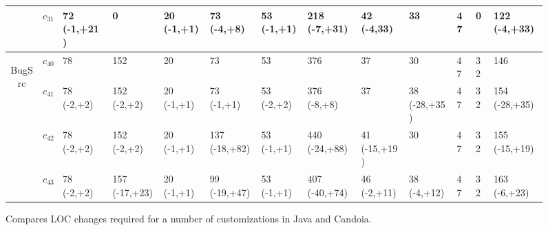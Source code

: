 \begin{figure}
\begin{adjustbox}{max width=\textwidth}
\begin{tabular}{|c|c|l|l|l|l|l|l|l|l|l|l|l|}
\cline{2-13} & $c_{31}$ & 72 (-1,+21) & 0 & 20 (-1,+1) & 73 (-4,+8) & 53 (-1,+1)
& 218 (-7,+31) & 42 (-4,33) & 33 & 47 & 0 & 122 (-4,+33)
\\

\hline

\multirow{4}{*}{\begin{sideways}BugSrc\end{sideways}} 
& $c_{40}$ & 78 & 152 & 20 & 73 & 53 & 376 & 37 & 30 & 47 & 32 & 146 \\ 

\cline{2-13} & $c_{41}$ & 78 (-2,+2) & 152 (-2,+2) & 20 (-1,+1) & 73 (-1,+1) &
53 (-2,+2) & 376 (-8,+8) & 37 & 38 (-28,+35) & 47 & 32 & 154 (-28,+35)
\\

\cline{2-13} & $c_{42}$ & 78 (-2,+2) & 152 (-2,+2) & 20 (-1,+1) & 137 (-18,+82)
& 53 (-1,+1) & 440 (-24,+88) & 41 (-15,+19) & 30 & 47 & 32 & 155 (-15,+19)
\\
  
\cline{2-13} & $c_{43}$ & 78 (-2,+2) & 157 (-17,+23) & 20 (-1,+1) & 99 (-19,+47)
& 53 (-1,+1) & 407 (-40,+74) & 46 (-2,+11) & 38 (-4,+12) & 47 & 32 & 163
(-6,+23)
\\

\hline
\end{tabular}
\end{adjustbox}
\caption{\tiny{Compares LOC changes required for a number of customizations in Java and Candoia.}}
\label{fig:customizability}
\end{figure}
